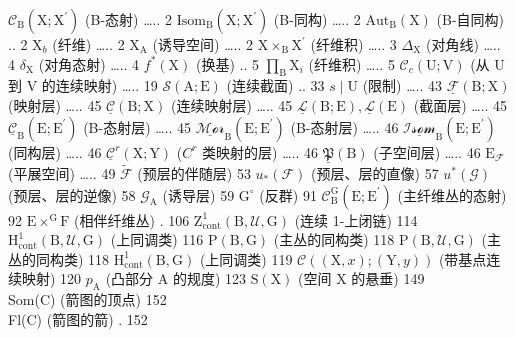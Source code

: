 
 \(\mathcal{C}_{\mathrm{B}}(\mathrm{X};\mathrm{X}^{\prime})\) (B-态射) \ldots.. 2 \(\mathrm{Isom}_{\mathrm{B}}(\mathrm{X};\mathrm{X}^{\prime})\) (B-同构) \ldots.. 2 \(\mathrm{Aut}_{\mathrm{B}}(\mathrm{X})\) (B-自同构) .. 2 \(\mathrm{X}_{b}\) (纤维) \ldots.. 2 \(\mathrm{X}_{\mathrm{A}}\) (诱导空间) \ldots.. 2 \(\mathrm{X} \times_{\mathrm{B}} \mathrm{X}^{\prime}\) (纤维积) \ldots.. 3 \(\Delta_{\mathrm{X}}\) (对角线) \ldots.. 4 \(\delta_{\mathrm{X}}\) (对角态射) \ldots.. 4 \(f^{*}(\mathrm{X})\) (换基) .. 5 \(\prod_{\mathrm{B}} \mathrm{X}_{i}\) (纤维积) \ldots.. 5 \(\mathcal{C}_{c}(\mathrm{U};\mathrm{V})\) (从 U 到 V 的连续映射) \ldots.. 19 \(\mathcal{S}(\mathrm{A};\mathrm{E})\) (连续截面) .. 33 \(s \mid \mathrm{U}\) (限制) \ldots.. 43 \(\underline{\mathcal{F}}(\mathrm{B};\mathrm{X})\) (映射层) \ldots.. 45 \(\underline{\mathcal{C}}(\mathrm{B};\mathrm{X})\) (连续映射层) \ldots.. 45 \(\underline{\mathcal{L}}(\mathrm{B};\mathrm{E}), \underline{\mathcal{L}}(\mathrm{E})\) (截面层) \ldots.. 45 \(\underline{\mathcal{C}}_{\mathrm{B}}(\mathrm{E};\mathrm{E}^{\prime})\) (B-态射层) \ldots.. 45 \(\underline{\mathcal{Mor}}_{\mathrm{B}}(\mathrm{E};\mathrm{E}^{\prime})\) (B-态射层) \ldots.. 46 \(\underline{\mathcal{Isom}}_{\mathrm{B}}(\mathrm{E};\mathrm{E}^{\prime})\) (同构层) \ldots.. 46 \(\underline{\mathcal{C}}^{r}(\mathrm{X};\mathrm{Y})\) (\(C^{r}\) 类映射的层) \ldots.. 46 \(\underline{\mathfrak{P}}(\mathrm{B})\) (子空间层) \ldots.. 46 \(\mathrm{E}_{\mathcal{F}}\) (平展空间) \ldots.. 49 \(\widetilde{\mathcal{F}}\) (预层的伴随层) 53 \(u_{*}(\mathcal{F})\) (预层、层的直像) 57 \(u^{*}(\mathcal{G})\) (预层、层的逆像) 58 \(\mathcal{G}_{\mathrm{A}}\) (诱导层) 59 \(\mathrm{G}^{\circ}\) (反群) 91 \(\mathcal{C}_{\mathrm{B}}^{\mathrm{G}}(\mathrm{E};\mathrm{E}^{\prime})\) (主纤维丛的态射) 92 \(\mathrm{E} \times^{\mathrm{G}} \mathrm{F}\) (相伴纤维丛) . 106 \(\mathrm{Z}_{\mathrm{cont}}^{1}(\mathrm{B},\mathcal{U},\mathrm{G})\) (连续 1-上闭链) 114 \(\mathrm{H}_{\mathrm{cont}}^{1}(\mathrm{B},\mathcal{U},\mathrm{G})\) (上同调类) 116 \(\mathrm{P}(\mathrm{B},\mathrm{G})\) (主丛的同构类) 118 \(\mathrm{P}(\mathrm{B},\mathcal{U},\mathrm{G})\) (主丛的同构类) 118 \(\mathrm{H}_{\mathrm{cont}}^{1}(\mathrm{B},\mathrm{G})\) (上同调类) 119 \(\mathcal{C}((\mathrm{X},x);(\mathrm{Y},y))\) (带基点连续映射) 120 \(p_{\mathrm{A}}\) (凸部分 A 的规度) 123 \(\mathrm{S}(\mathrm{X})\) (空间 X 的悬垂) 149\\
Som(C) (箭图的顶点) 152\\
Fl(C) (箭图的箭) . 152

